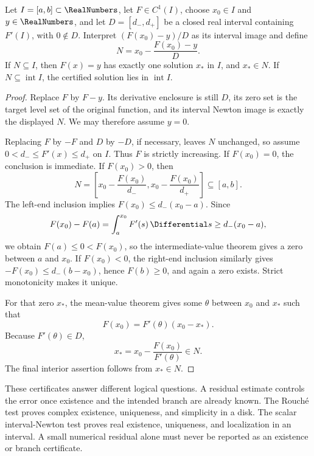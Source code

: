 \begin{theorem}
\label{thm:uq-interval-newton-certificate}
Let \(I=[a,b]\subset\RealNumbers\), let \(F\in C^1(I)\), choose
\(x_0\in I\) and \(y\in\RealNumbers\), and let
\(D=[d_-,d_+]\) be a closed real interval containing \(F'(I)\), with
\(0\notin D\).  Interpret \((F(x_0)-y)/D\) as its interval image and define
\[
 N=x_0-\frac{F(x_0)-y}{D}.
\]
If \(N\subseteq I\), then \(F(x)=y\) has exactly one solution \(x_*\) in
\(I\), and \(x_*\in N\).  If \(N\subseteq\operatorname{int}I\), the
certified solution lies
in \(\operatorname{int}I\).
\end{theorem}

\begin{proof}
Replace \(F\) by \(F-y\).  Its derivative enclosure is still \(D\), its
zero set is the target level set of the original function, and its interval
Newton image is exactly the displayed \(N\).  We may therefore assume
\(y=0\).

Replacing \(F\) by \(-F\) and \(D\) by \(-D\), if necessary, leaves \(N\)
unchanged, so assume
\(0<d_-\le F'(x)\le d_+\) on \(I\).  Thus \(F\) is strictly increasing.
If \(F(x_0)=0\), the conclusion is immediate.  If \(F(x_0)>0\), then
\[
 N=\left[
 x_0-\frac{F(x_0)}{d_-},
 x_0-\frac{F(x_0)}{d_+}
 \right]\subseteq[a,b].
\]
The left-end inclusion implies
\(F(x_0)\le d_-(x_0-a)\).  Since
\[
 F(x_0)-F(a)=\int_a^{x_0}F'(s)\,\Differential s
 \ge d_-(x_0-a),
\]
we obtain \(F(a)\le0<F(x_0)\), so the intermediate-value theorem gives a
zero between \(a\) and \(x_0\).  If \(F(x_0)<0\), the right-end inclusion
similarly gives
\(-F(x_0)\le d_-(b-x_0)\), hence \(F(b)\ge0\), and again a zero exists.
Strict monotonicity makes it unique.

For that zero \(x_*\), the mean-value theorem gives some \(\theta\) between
\(x_0\) and \(x_*\) such that
\[
 F(x_0)=F'(\theta)(x_0-x_*).
\]
Because \(F'(\theta)\in D\),
\[
 x_*=x_0-\frac{F(x_0)}{F'(\theta)}\in N.
\]
The final interior assertion follows from \(x_*\in N\).
\end{proof}

\begin{boxedremark}
These certificates answer different logical questions.  A residual estimate
controls the error once existence and the intended branch are already known.
The Rouch\'e test proves complex existence, uniqueness, and simplicity in a
disk.  The scalar interval-Newton test proves real existence, uniqueness, and
localization in an interval.  A small numerical residual alone must never be
reported as an existence or branch certificate.
\end{boxedremark}
